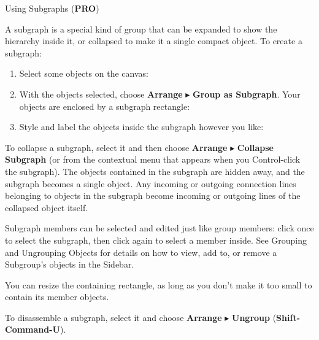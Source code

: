 \documentclass[../main.tex]{subfiles}
\begin{document}
\begin{ogsidebar}
  Using Subgraphs (\textbf{PRO})

  A subgraph is a special kind of group that can be expanded to show the hierarchy inside it, or
  collapsed to make it a single compact object. To create a subgraph:

  \begin{enumerate}
    \item Select some objects on the canvas:

    \item With the objects selected, choose \textbf{Arrange} $\blacktriangleright$ \textbf{Group
      as Subgraph}. Your objects are enclosed by a subgraph rectangle:

    \item Style and label the objects inside the subgraph however you like:

  \end{enumerate}

  To collapse a subgraph, select it and then choose \textbf{Arrange} $\blacktriangleright$
  \textbf{Collapse Subgraph} (or from the contextual menu that appears when you Control-click
  the subgraph). The objects contained in the subgraph are hidden away, and the subgraph
  becomes a single object. Any incoming or outgoing connection lines belonging to objects in
  the subgraph become incoming or outgoing lines of the collapsed object itself.


  Subgraph members can be selected and edited just like group members: click once to select the
  subgraph, then click again to select a member inside. See Grouping and Ungrouping Objects
  for details on how to view, add to, or remove a Subgroup's objects in the Sidebar.

  You can resize the containing rectangle, as long as you don't make it too small to contain its
  member objects.

  To disassemble a subgraph, select it and choose \textbf{Arrange} $\blacktriangleright$
  \textbf{Ungroup} (\textbf{Shift-Command-U}).
\end{ogsidebar}
\end{document}
